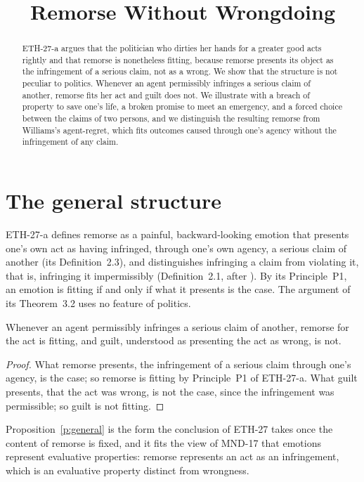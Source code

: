 \documentclass{situationist-preprint}
\title{Remorse Without Wrongdoing}
\begin{document}
\maketitle

\begin{abstract}
ETH-27-a argues that the politician who dirties her hands for a greater good acts rightly and that remorse is nonetheless fitting, because remorse presents its object as the infringement of a serious claim, not as a wrong. We show that the structure is not peculiar to politics. Whenever an agent permissibly infringes a serious claim of another, remorse fits her act and guilt does not. We illustrate with a breach of property to save one's life, a broken promise to meet an emergency, and a forced choice between the claims of two persons, and we distinguish the resulting remorse from Williams's agent-regret, which fits outcomes caused through one's agency without the infringement of any claim.
\end{abstract}

\section{The general structure}

ETH-27-a defines remorse as a painful, backward-looking emotion that presents one's own act as having infringed, through one's own agency, a serious claim of another (its Definition~2.3), and distinguishes infringing a claim from violating it, that is, infringing it impermissibly (Definition~2.1, after \citealt[ch.~3]{Thomson1990}). By its Principle~P1, an emotion is fitting if and only if what it presents is the case. The argument of its Theorem~3.2 uses no feature of politics.

\begin{proposition}\label{p:general}
Whenever an agent permissibly infringes a serious claim of another, remorse for the act is fitting, and guilt, understood as presenting the act as wrong, is not.
\end{proposition}

\begin{proof}
What remorse presents, the infringement of a serious claim through one's agency, is the case; so remorse is fitting by Principle~P1 of ETH-27-a. What guilt presents, that the act was wrong, is not the case, since the infringement was permissible; so guilt is not fitting.
\end{proof}

Proposition~\ref{p:general} is the form the conclusion of ETH-27 takes once the content of remorse is fixed, and it fits the view of MND-17 that emotions represent evaluative properties: remorse represents an act as an infringement, which is an evaluative property distinct from wrongness.
\end{document}
